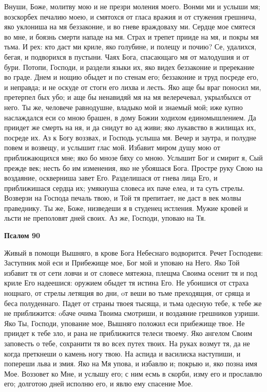 Внуши, Боже, молитву мою и не презри моления моего. Вонми ми и услыши мя; возскорбех печалию моею, и смятохся от гласа вражия и от стужения грешнича, яко уклониша на мя беззаконие, и во гневе враждоваху ми. Сердце мое смятеся во мне, и боязнь смерти нападе на мя. Страх и трепет прииде на мя, и покры мя тьма. И рех: кто даст ми криле, яко голубине, и полещу и почию? Се, удалихся, бегая, и подворихся в пустыни. Чаях Бога, спасающаго мя от малодушия и от бури. Потопи, Господи, и раздели языки их, яко видех беззаконие и пререкание во граде. Днем и нощию обыдет и по стенам его; беззаконие и труд посреде его, и неправда; и не оскуде от стогн его лихва и лесть. Яко аще бы враг поносил ми, претерпел бых убо; и аще бы ненавидяй мя на мя велеречевал, укрылбыхся от него. Ты же, человече равнодушне, владыко мой и знаемый мой; иже купно наслаждался еси со мною брашен, в дому Божии ходихом единомышлением. Да приидет же смерть на ня, и да снидут во ад живи; яко лукавство в жилищах их, посреде их. Аз к Богу воззвах, и Господь услыша мя. Вечер и заутра, и полудне повем и возвещу, и услышит глас мой. Избавит миром душу мою от приближающихся мне; яко бо мнозе бяху со мною. Услышит Бог и смирит я, Сый прежде век; несть бо им изменения, яко не убояшася Бога. Простре руку Свою на воздаяние, оскверниша завет Его. Разделишася от гнева лица Его, и приближишася сердца их; умякнуша словеса их паче елеа, и та суть стрелы. Возверзи на Господа печаль твою, и Той тя препитает, не даст в век молвы праведнику. Ты же, Боже, низведеши я в студенец истления. Мужие кровей и льсти не преполовят дней своих. Аз же, Господи, уповаю на Тя.


\medskip
\bfseries Псалом 90\normalfont{}


Живый в помощи Вышняго, в крове Бога Небеснаго водворится. Речет Господеви: Заступник мой еси и Прибежище мое, Бог мой и уповаю на Него. Яко Той избавит тя от сети ловчи и от словесе мятежна, плещма Своима осенит тя и под криле Его надеешися: оружием обыдет тя истина Его. Не убоишися от страха нощнаго, от стрелы летящия во дни, oт веши во тьме преходящия, от сряща и беса полуденнаго. Падет от страны твоея тысяща, и тьма одесную тебе, к тебе же не приближится: oбаче очима Твоима смотриши, и воздаяние грешников узриши. Яко Ты, Господи, упование мое, Вышняго положил еси прибежище твое. Не приидет к тебе зло, и рана не приближится телеси твоему. Яко ангелом Своим заповесть о тебе, сохранити тя во всех путех твоих. На руках возмут тя, да не когда преткнеши о камень ногу твою. На аспида и василиска наступиши, и попереши льва и змия. Яко на Мя упова, и избавлю и; покрыю и, яко позна имя Мое. Воззовет ко Мне, и услышу его; с ним есмь в скорби, изму его и прославлю его; долготою дней исполню его, и явлю ему спасение Мое.





